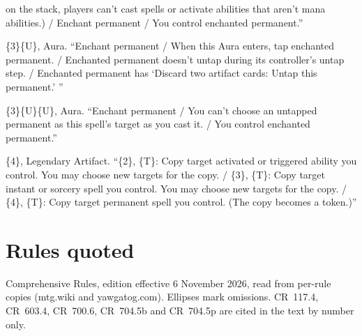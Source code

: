 \documentclass[11pt]{article}
\theoremstyle{definition}
\newcommand{\ms}[1]{\{#1\}}
\newcommand{\card}[1]{{\mdseries\scshape #1}}
\newcommand{\CR}[1]{CR~#1}
\begin{document}
\begin{description}[leftmargin=1em,itemsep=1pt,parsep=0pt]
  on the stack, players can't cast spells or activate abilities that aren't mana
  abilities.) / Enchant permanent / You control enchanted permanent.''
\item[\card{Psychic Overload}] \ms{3}\ms{U}, Aura. ``Enchant permanent / When this Aura enters,
  tap enchanted permanent. / Enchanted permanent doesn't untap during its controller's untap
  step. / Enchanted permanent has `Discard two artifact cards: Untap this permanent.' ''
\item[\card{Dream Leash}] \ms{3}\ms{U}\ms{U}, Aura. ``Enchant permanent / You can't choose an
  untapped permanent as this spell's target as you cast it. / You control enchanted
  permanent.''
\item[\card{Lithoform Engine}] \ms{4}, Legendary Artifact. ``\ms{2}, \ms{T}: Copy target
  activated or triggered ability you control. You may choose new targets for the copy. /
  \ms{3}, \ms{T}: Copy target instant or sorcery spell you control. You may choose new targets
  for the copy. / \ms{4}, \ms{T}: Copy target permanent spell you control. (The copy becomes a
  token.)''
\end{description}
\endgroup

\section{Rules quoted}\label{app:rules}

Comprehensive Rules, edition effective 6 November 2026, read from per-rule copies
(mtg.wiki and yawgatog.com). Ellipses mark omissions. \CR{117.4}, \CR{603.4}, \CR{700.6},
\CR{704.5b} and \CR{704.5p} are cited in the text by number only.
\end{document}
